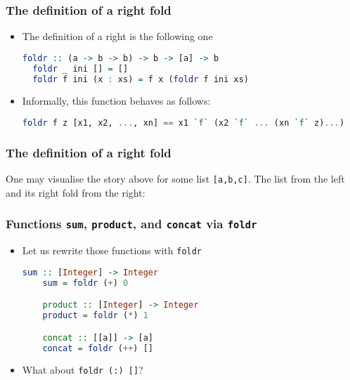 \documentclass[10pt,pdf,utf8,russian,aspectratio=169]{beamer}
\begin{document}
\begin{frame}[fragile]
\frametitle{The definition of a right fold}
\begin{itemize}
  \item The definition of a right is the following one
  \begin{lstlisting}[language=Haskell]
  foldr :: (a -> b -> b) -> b -> [a] -> b
  foldr _ ini [] = []
  foldr f ini (x : xs) = f x (foldr f ini xs)
  \end{lstlisting}
  \item Informally, this function behaves as follows:
  \begin{lstlisting}[language=Haskell]
  foldr f z [x1, x2, ..., xn] == x1 `f` (x2 `f` ... (xn `f` z)...)
  \end{lstlisting}
\end{itemize}
\end{frame}

\begin{frame}
  \frametitle{The definition of a right fold}
One may visualise the story above for some list \verb"[a,b,c]". The list from the left and its right fold from the right:

\begin{small}
\end{small}
\end{frame}

\begin{frame}[fragile]
  \frametitle{Functions \verb"sum", \verb"product", and \verb"concat" via \verb"foldr"}
  \begin{itemize}
    \item Let us rewrite those functions with \verb"foldr"
    \begin{lstlisting}[language=Haskell]
    sum :: [Integer] -> Integer
    sum = foldr (+) 0

    product :: [Integer] -> Integer
    product = foldr (*) 1

    concat :: [[a]] -> [a]
    concat = foldr (++) []
    \end{lstlisting}
    \item What about \verb"foldr (:) []"?
  \end{itemize}
\end{frame}
\end{document}
